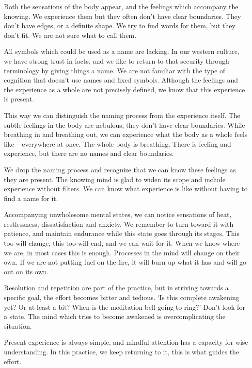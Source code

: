 Both the sensations of the body appear, and the feelings which accompany
the knowing. We experience them but they often don't have clear
boundaries. They don't have edges, or a definite shape. We try to find
words for them, but they don't fit. We are not sure what to call them.

All symbols which could be used as a name are lacking. In our western
culture, we have strong trust in facts, and we like to return to that
security through terminology by giving things a name. We are not
familiar with the type of cognition that doesn't use names and fixed
symbols. Although the feelings and the experience as a whole are not
precisely defined, we know that this experience is present.

This way we can distinguish the naming process from the experience
itself. The subtle feelings in the body are nebulous, they don't have
clear boundaries. While breathing in and breathing out, we can
experience what the body as a whole feels like -- everywhere at once.
The whole body is breathing. There is feeling and experience, but there
are no names and clear boundaries.

We drop the naming process and recognize that we can know these feelings
as they are present. The knowing mind is glad to widen its scope and
include experience without filters. We can know what experience is like
without having to find a name for it.


Accompanying unwholesome mental states, we can notice sensations of
heat, restlessness, dissatisfaction and anxiety. We remember to turn
toward it with patience, and maintain endurance while this state goes
through its stages. This too will change, this too will end, and we can
wait for it. When we know where we are, in most cases this is enough.
Processes in the mind will change on their own. If we are not putting
fuel on the fire, it will burn up what it has and will go out on its
own.

Resolution and repetition are part of the practice, but in striving
towards a specific goal, the effort becomes bitter and tedious. `Is this
complete awakening yet? Or at least a bit? When is the meditation bell
going to ring?' Don't look for a state. The mind which tries to become
awakened is overcomplicating the situation.

Present experience is always simple, and mindful attention has a
capacity for wise understanding. In this practice, we keep returning to
it, this is what guides the effort.

